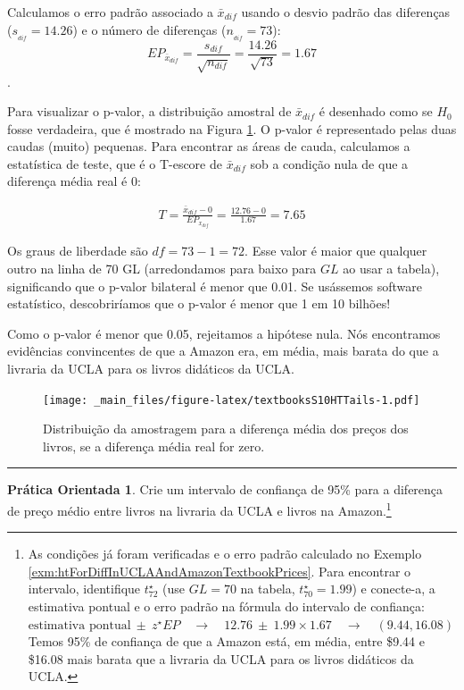 \documentclass[
]{book}
\theoremstyle{definition}
\theoremstyle{definition}
\theoremstyle{definition}
\newtheorem{exercise}{Prática Orientada}[chapter]
\theoremstyle{definition}
\theoremstyle{remark}
\begin{document}
Calculamos o erro padrão associado a \(\bar{x}_{dif}\) usando o desvio padrão das diferenças (\(s_{_{dif}}=14.26\)) e o número de diferenças (\(n_{_{dif}}=73\)):
\[EP_{\bar{x}_{dif}} = \frac{s_{dif}}{\sqrt{n_{dif}}} = \frac{14.26}{\sqrt{73}} = 1.67\].

Para visualizar o p-valor, a distribuição amostral de \(\bar{x}_{dif}\) é desenhado como se \(H_0\) fosse verdadeira, que é mostrado na Figura \ref{fig:textbooksS10HTTails}. O p-valor é representado pelas duas caudas (muito) pequenas. Para encontrar as áreas de cauda, calculamos a estatística de teste, que é o T-escore de \(\bar{x}_{dif}\) sob a condição nula de que a diferença média real é 0:

\begin{align*}
T = \frac{\bar{x}_{dif} - 0}{EP_{x_{dif}}} = \frac{12.76 - 0}{1.67} = 7.65
\end{align*}

Os graus de liberdade são \(df = 73 - 1 = 72\). Esse valor é maior que qualquer outro na linha de 70 GL (arredondamos para baixo para \(GL\) ao usar a tabela), significando que o p-valor bilateral é menor que 0.01. Se usássemos software estatístico, descobriríamos que o p-valor é menor que 1 em 10 bilhões!

Como o p-valor é menor que 0.05, rejeitamos a hipótese nula. Nós encontramos evidências convincentes de que a Amazon era, em média, mais barata do que a livraria da UCLA para os livros didáticos da UCLA.

\begin{figure}
\centering
\texttt{[image: \_main\_files/figure-latex/textbooksS10HTTails-1.pdf]}
\caption{\label{fig:textbooksS10HTTails}Distribuição da amostragem para a diferença média dos preços dos livros, se a diferença média real for zero.}
\end{figure}

\begin{center}\rule{0.5\linewidth}{0.5pt}\end{center}

\begin{exercise}
\protect\hypertarget{exr:unnamed-chunk-199}{}{\label{exr:unnamed-chunk-199} }Crie um intervalo de confiança de 95\% para a diferença de preço médio entre livros na livraria da UCLA e livros na Amazon.\footnote{As condições já foram verificadas e o erro padrão calculado no Exemplo \ref{exm:htForDiffInUCLAAndAmazonTextbookPrices}. Para encontrar o intervalo, identifique \(t^{\star}_{72}\) (use \(GL=70\) na tabela, \(t^{\star}_{70} = 1.99\)) e conecte-a, a estimativa pontual e o erro padrão na fórmula do intervalo de confiança: \(\text{estimativa pontual} \ \pm\ z^{\star}EP \quad\to\quad 12.76 \ \pm\ 1.99\times 1.67 \quad\to\quad (9.44, 16.08)\)
  Temos 95\% de confiança de que a Amazon está, em média, entre \$9.44 e \$16.08 mais barata que a livraria da UCLA para os livros didáticos da UCLA.}
\end{exercise}
\end{document}
